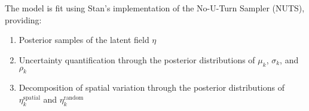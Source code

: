 \documentclass[
  letterpaper,
  DIV=11,
  numbers=noendperiod]{scrartcl}
\providecommand{\tightlist}{%
  \setlength{\itemsep}{0pt}\setlength{\parskip}{0pt}}\usepackage{longtable,booktabs,array}
\begin{document}
The model is fit using Stan's implementation of the No-U-Turn Sampler
(NUTS), providing:

\begin{enumerate}
\def\labelenumi{\arabic{enumi}.}
\tightlist
\item
  Posterior samples of the latent field \(\eta\)
\item
  Uncertainty quantification through the posterior distributions of
  \(\mu_k\), \(\sigma_k\), and \(\rho_k\)
\item
  Decomposition of spatial variation through the posterior distributions
  of \(\eta^{\text{spatial}}_k\) and \(\eta^{\text{random}}_k\)
\end{enumerate}
\end{document}
